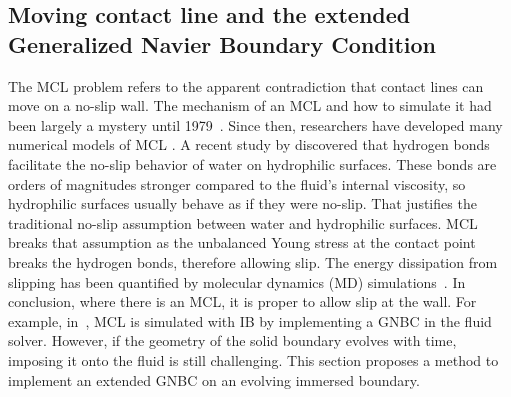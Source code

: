\documentclass{jfm}
\begin{document}
\subsection{Moving contact line and the extended Generalized Navier Boundary Condition} \label{subsec:mcl}
The MCL problem refers to the apparent contradiction that contact lines can move on a no-slip wall. The mechanism of an MCL and how to simulate it had been largely a mystery until 1979~\citep{dussan1979spreading}. Since then, researchers have developed many numerical models of MCL \citep{sui2014numerical, liu2015diffuse}. A recent study by \citet{johansson2015water} discovered that hydrogen bonds facilitate the no-slip behavior of water on hydrophilic surfaces. These bonds are orders of magnitudes stronger compared to the fluid's internal viscosity, so hydrophilic surfaces usually behave as if they were no-slip. That justifies the traditional no-slip assumption between water and hydrophilic surfaces. MCL breaks that assumption as the unbalanced Young stress at the contact point breaks the hydrogen bonds, therefore allowing slip. The energy dissipation from slipping has been quantified by molecular dynamics (MD) simulations~\citep{johansson2018molecular}. In conclusion, where there is an MCL, it is proper to allow slip at the wall. For example, in~\citep{lai2010numerical}, MCL is simulated with IB by implementing a GNBC in the fluid solver. However, if the geometry of the solid boundary evolves with time, imposing it onto the fluid is still challenging. This section proposes a method to implement an extended GNBC on an evolving immersed boundary. 
\end{document}
